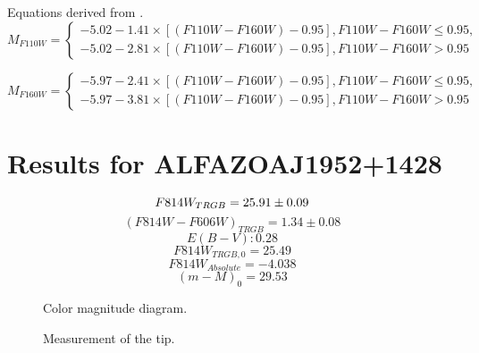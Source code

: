 \documentclass[12,manuscript,usenatbib]{aastex}
\begin{document}
Equations derived from \citet{2014AJ....148....7W}.
\begin{equation}
M_{F110W}=\left\{\begin{matrix}
-5.02 -1.41 \times [(F110W-F160W)-0.95], F110W-F160W \leqslant 0.95,
\\ 
-5.02 -2.81 \times[(F110W-F160W)-0.95], F110W-F160W > 0.95
\end{matrix}\right.
\end{equation}

\begin{equation}
M_{F160W}=\left\{\begin{matrix}
-5.97 -2.41 \times [(F110W-F160W)-0.95], F110W-F160W \leqslant 0.95,
\\ 
-5.97 -3.81 \times[(F110W-F160W)-0.95], F110W-F160W > 0.95
\end{matrix}\right.
\end{equation}




\section{Results for ALFAZOAJ1952+1428}

\begin{equation}
F814W_{TRGB}=25.91 \pm 0.09 \\
\end{equation}
\begin{equation}
(F814W-F606W)_{TRGB}=1.34 \pm 0.08
\end{equation}
\begin{equation}
E(B-V): 0.28
\end{equation}
\begin{equation}
F814W_{TRGB,0} = 25.49
\end{equation}
\begin{equation}
F814W_{Absolute} = -4.038
\end{equation}
\begin{equation}
(m-M)_0=29.53
\end{equation}

\begin{figure}
\caption{Color magnitude diagram.\label{cmd1}}
\end{figure}

\begin{figure}
\caption{Measurement of the tip.\label{lf1}}
\end{figure}
\end{document}
